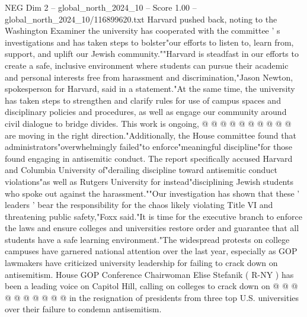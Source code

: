 \begin{textsample}{NEG Dim 2 – global\_north\_2024\_10 – Score 1.00 – global\_north\_2024\_10/116899620.txt}
Harvard pushed back, noting to the Washington Examiner the university has cooperated with the committee ' s investigations and has taken steps to bolster"our efforts to listen to, learn from, support, and uplift our Jewish community.""Harvard is steadfast in our efforts to create a safe, inclusive environment where students can pursue their academic and personal interests free from harassment and discrimination,"Jason Newton, spokesperson for Harvard, said in a statement."At the same time, the university has taken steps to strengthen and clarify rules for use of campus spaces and disciplinary policies and procedures, as well as engage our community around civil dialogue to bridge divides.
This work is ongoing, @ @ @ @ @ @ @ @ @ @ are moving in the right direction."Additionally, the House committee found that administrators"overwhelmingly failed"to enforce"meaningful discipline"for those found engaging in antisemitic conduct.
The report specifically accused Harvard and Columbia University of"derailing discipline toward antisemitic conduct violations"as well as Rutgers University for instead"disciplining Jewish students who spoke out against the harassment.""Our investigation has shown that these ' leaders ' bear the responsibility for the chaos likely violating Title VI and threatening public safety,"Foxx said."It is time for the executive branch to enforce the laws and ensure colleges and universities restore order and guarantee that all students have a safe learning environment."The widespread protests on college campuses have garnered national attention over the last year, especially as GOP lawmakers have criticized university leadership for failing to crack down on antisemitism.
House GOP Conference Chairwoman Elise Stefanik ( R-NY ) has been a leading voice on Capitol Hill, calling on colleges to crack down on @ @ @ @ @ @ @ @ @ @ in the resignation of presidents from three top U.S. universities over their failure to condemn antisemitism.

\end{textsample}
